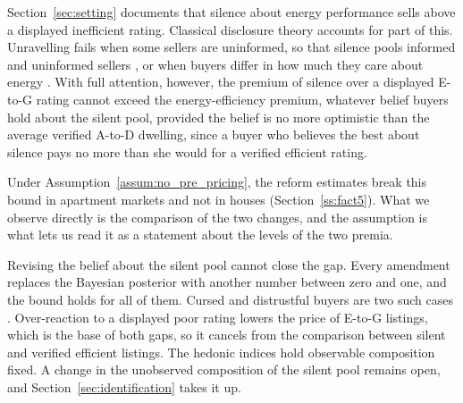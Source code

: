 Section~\ref{sec:setting} documents that silence about energy performance sells above a displayed inefficient rating. Classical disclosure theory accounts for part of this. Unravelling fails when some sellers are uninformed, so that silence pools informed and uninformed sellers \citep{dye_disclosure_1985, jung_kwon_1988}, or when buyers differ in how much they care about energy \citep{fishman_mandatory_2003}. With full attention, however, the premium of silence over a displayed E-to-G rating cannot exceed the energy-efficiency premium, whatever belief buyers hold about the silent pool, provided the belief is no more optimistic than the average verified A-to-D dwelling, since a buyer who believes the best about silence pays no more than she would for a verified efficient rating.

Under Assumption~\ref{assum:no_pre_pricing}, the reform estimates break this bound in apartment markets and not in houses (Section~\ref{ss:fact5}). What we observe directly is the comparison of the two changes, and the assumption is what lets us read it as a statement about the levels of the two premia.

Revising the belief about the silent pool cannot close the gap. Every amendment replaces the Bayesian posterior with another number between zero and one, and the bound holds for all of them. Cursed and distrustful buyers are two such cases \citep[e.g.,][]{eyster_cursed_2005, jin_is_2021, hagenbach_motivated_2025}. Over-reaction to a displayed poor rating lowers the price of E-to-G listings, which is the base of both gaps, so it cancels from the comparison between silent and verified efficient listings. The hedonic indices hold observable composition fixed. A change in the unobserved composition of the silent pool remains open, and Section~\ref{sec:identification} takes it up.

